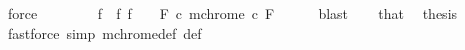 \begin{isabellebody}
\ force\isanewline
\ \ \isamarkupfalse%
\isanewline
\ \ \isamarkupfalse%
\ \isamarkupfalse%
\ f\ \ f{\isacharcolon}{\kern0pt}\ {\isachardoublequoteopen}f\ {\isasymin}\ {\isasymOmega}\ {\isacharminus}{\kern0pt}\ {\isacharparenleft}{\kern0pt}{\isasymUnion}F{\isasymin}{\isasymF}{\isachardot}{\kern0pt}\ {\isasymUnion}c{\isacharless}{\kern0pt}{}{\isachardot}{\kern0pt}\ mchrome\ c\ F{\isacharparenright}{\kern0pt}{\isachardoublequoteclose}\isanewline
\ \ \ \ \isamarkupfalse%
\ blast\isanewline
\ \ \isamarkupfalse%
\ that\ \isamarkupfalse%
\ {\isacharquery}{\kern0pt}thesis\isanewline
\ \ \ \ \isamarkupfalse%
\ {\isacharparenleft}{\kern0pt}fastforce\ simp{\isacharcolon}{\kern0pt}\ mchrome{\isacharunderscore}{\kern0pt}def\ {\isasymOmega}{\isacharunderscore}{\kern0pt}def{\isacharparenright}{\kern0pt}\isanewline
{}\isamarkupfalse%
%
\endisatagproof
{\isafoldproof}%
%
\isadelimproof
\isanewline
%
\endisadelimproof
%
\isadelimtheory
\isanewline
%
\endisadelimtheory
%
\isatagtheory
{}\isamarkupfalse%
%
\endisatagtheory
{\isafoldtheory}%
%
\isadelimtheory
%
\endisadelimtheory
%
\end{isabellebody}%
\endinput

